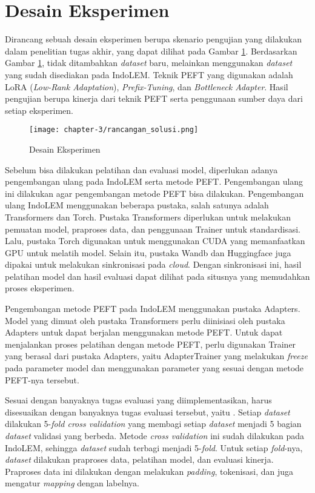 \section{Desain Eksperimen}
\label{sec:rancangan-solusi}

Dirancang sebuah desain eksperimen berupa skenario pengujian yang dilakukan dalam penelitian tugas akhir, yang dapat dilihat pada Gambar \ref{fig:rancangan-solusi}. Berdasarkan Gambar \ref{fig:rancangan-solusi}, tidak ditambahkan \textit{dataset} baru, melainkan menggunakan \textit{dataset} yang sudah disediakan pada IndoLEM. Teknik PEFT yang digunakan adalah LoRA (\textit{Low-Rank Adaptation}), \textit{Prefix-Tuning}, dan \textit{Bottleneck Adapter}. Hasil pengujian berupa kinerja dari teknik PEFT serta penggunaan sumber daya dari setiap eksperimen.

\begin{figure}[ht]
    \centering
    \texttt{[image: chapter-3/rancangan\_solusi.png]}
    \caption{Desain Eksperimen}
    \label{fig:rancangan-solusi}
\end{figure}

Sebelum bisa dilakukan pelatihan dan evaluasi model, diperlukan adanya pengembangan ulang pada IndoLEM serta metode PEFT. Pengembangan ulang ini dilakukan agar pengembangan metode PEFT bisa dilakukan. Pengembangan ulang IndoLEM  menggunakan beberapa pustaka, salah satunya adalah Transformers dan Torch. Pustaka Transformers diperlukan untuk melakukan pemuatan model, praproses data, dan penggunaan Trainer untuk standardisasi. Lalu, pustaka Torch digunakan untuk menggunakan CUDA yang memanfaatkan GPU untuk melatih model. Selain itu, pustaka Wandb dan Huggingface juga  dipakai untuk melakukan sinkronisasi pada \textit{cloud}. Dengan sinkronisasi ini, hasil pelatihan model dan hasil evaluasi dapat dilihat pada situsnya yang  memudahkan proses eksperimen. 

Pengembangan metode PEFT pada IndoLEM  menggunakan pustaka Adapters. Model yang dimuat oleh pustaka Transformers perlu diinisiasi oleh pustaka Adapters untuk dapat berjalan menggunakan metode PEFT. Untuk dapat menjalankan proses pelatihan dengan metode PEFT, perlu digunakan Trainer yang berasal dari pustaka Adapters, yaitu AdapterTrainer yang  melakukan \textit{freeze} pada parameter model dan  menggunakan parameter yang sesuai dengan metode PEFT-nya tersebut.

Sesuai dengan banyaknya tugas evaluasi yang diimplementasikan, harus disesuaikan dengan banyaknya tugas evaluasi tersebut, yaitu \nlptask. Setiap \textit{dataset}  dilakukan 5-\textit{fold cross validation} yang membagi setiap \textit{dataset} menjadi 5 bagian \textit{dataset} validasi yang berbeda. Metode \textit{cross validation} ini sudah dilakukan pada IndoLEM, sehingga \textit{dataset} sudah terbagi menjadi 5-\textit{fold}. Untuk setiap \textit{fold}-nya, \textit{dataset}  dilakukan praproses data, pelatihan model, dan evaluasi kinerja. Praproses data ini dilakukan dengan melakukan \textit{padding}, tokenisasi, dan juga mengatur \textit{mapping} dengan labelnya. 


